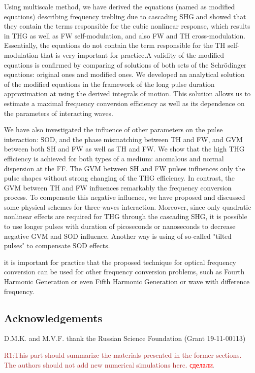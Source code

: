 \documentclass[a4paper, 12pt, onecolumn]{extarticle}
\begin{document}
Using multiscale method, we have derived the equations (named as modified equations) describing frequency trebling due to cascading SHG and showed that they contain the terms responsible for the cubic nonlinear response, which results in THG as well as FW self-modulation, and also FW and TH cross-modulation. Essentially, the equations do not contain the term responsible for the TH self-modulation that is very important for practice.A validity of the modified equations is confirmed by comparing of solutions of both sets of the Schr\"{o}dinger equations: original ones and modified ones. We developed an analytical solution of the modified equations in the framework of the long pulse duration approximation at using the derived integrals of motion. This solution allows us to estimate a maximal frequency conversion efficiency as well as its dependence on the parameters of interacting waves.

We have also investigated the influence of other parameters on the pulse interaction: SOD, and the phase mismatching between TH and FW, and GVM between both SH and FW as well as TH and FW.  We show that the high THG efficiency is achieved for both types of a medium: anomalous and normal dispersion at the FF. The GVM between SH and FW pulses influences only the pulse shapes without strong changing of the THG efficiency. In contrast, the GVM between TH and FW influences remarkably the frequency conversion process. To compensate this negative influence, we have proposed and discussed some physical schemes for three-waves interaction. Moreover, since only quadratic nonlinear effects are required for THG through the cascading SHG, it is possible to use longer pulses with duration of picoseconds or nanoseconds to decrease negative GVM and SOD influence. Another way is using of so-called "tilted pulses" \cite{bib:tilt1,bib:tilt2} to compensate SOD effects.

it is important for practice that the proposed technique for optical frequency conversion can be used for other frequency conversion problems, such as Fourth Harmonic Generation or even Fifth Harmonic Generation or wave with difference frequency.

\subsection*{Acknowledgements}
D.M.K. and M.V.F. thank the Russian Science Foundation (Grant 19-11-00113)



\textcolor{brown}{R1:This part should summarize the materials presented in the former sections. The authors should not add new numerical simulations here.} \textcolor{red}{сделали}.
\end{document}
